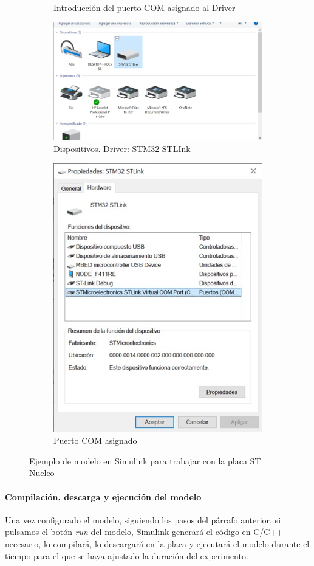 \documentclass[10pt,a4paper]{report}
\begin{document}
\begin{figure}
\begin{subfigure}{0.5\textwidth}
\caption{Introducción del puerto COM asignado al Driver}\label{f17f}
\end{subfigure}
\begin{subfigure}{0.5\textwidth}
\centering
\includegraphics[width = \linewidth]{eje7.jpg}
\caption{Dispositivos. Driver: STM32 STLInk}\label{f17g}
\end{subfigure}
\begin{subfigure}{0.5\textwidth}
\centering
\includegraphics[width = 0.6\linewidth]{eje8.jpg}
\caption{Puerto COM asignado}\label{f17h}
\end{subfigure}

\caption{Ejemplo de modelo en Simulink para trabajar con la placa ST Nucleo}\label{f17}
\end{figure} 

\paragraph{Compilación, descarga y ejecución del modelo}
Una vez configurado el modelo, siguiendo los pasos del párrafo anterior, si pulsamos el botón \emph{run} del modelo, Simulink generará el código en C/C++ necesario, lo compilará, lo descargará en la placa y ejecutará el modelo durante el tiempo para el que se haya ajustado la duración del experimento.
\end{document}
